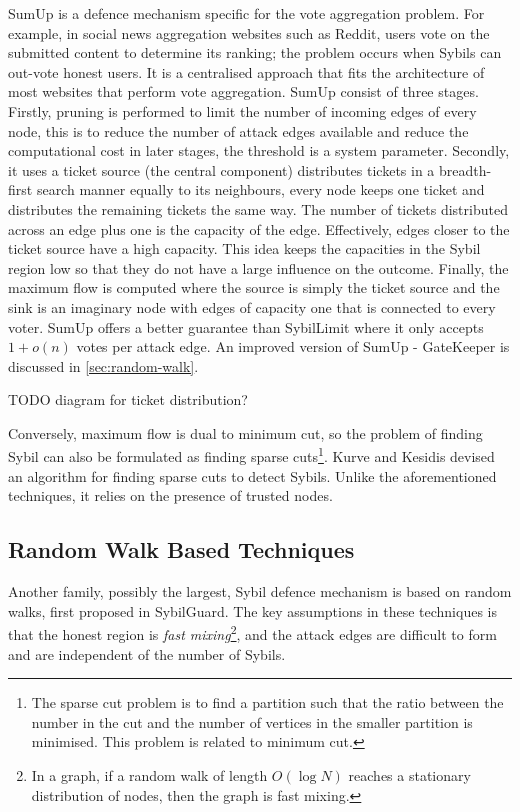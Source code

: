 SumUp\cite{tran2009sybil} is a defence mechanism specific for the vote
aggregation problem. For example, in social news aggregation websites such as
Reddit, users vote on the submitted content to determine its ranking; the
problem occurs when Sybils can out-vote honest users. It is a centralised
approach that fits the architecture of most websites that perform vote
aggregation. SumUp consist of three stages. Firstly, pruning is performed to
limit the number of incoming edges of every node, this is to reduce the number
of attack edges available and reduce the computational cost in later stages, the
threshold is a system parameter. Secondly, it uses a ticket source (the central
component) distributes tickets in a breadth-first search manner equally to its
neighbours, every node keeps one ticket and distributes the remaining tickets
the same way. The number of tickets distributed across an edge plus one is the
capacity of the edge. Effectively, edges closer to the ticket source have a high
capacity. This idea keeps the capacities in the Sybil region low so that they do
not have a large influence on the outcome. Finally, the maximum flow is computed
where the source is simply the ticket source and the sink is an imaginary node
with edges of capacity one that is connected to every voter. SumUp offers a
better guarantee than SybilLimit where it only accepts $1 + o(n)$ votes per
attack edge. An improved version of SumUp - GateKeeper is discussed in
\autoref{sec:random-walk}.

TODO diagram for ticket distribution?

Conversely, maximum flow is dual to minimum cut, so the problem of finding Sybil
can also be formulated as finding sparse cuts\footnote{The sparse cut problem is
  to find a partition such that the ratio between the number in the cut and the
  number of vertices in the smaller partition is minimised. This problem is
  related to minimum cut.}. Kurve and Kesidis devised an algorithm for finding
sparse cuts to detect Sybils\cite{kurve2011sybil}. Unlike the aforementioned
techniques, it relies on the presence of trusted nodes.

\subsection{Random Walk Based Techniques}\label{sec:random-walk}
Another family, possibly the largest, Sybil defence mechanism is based on random
walks, first proposed in SybilGuard\cite{yu2006sybilguard}. The key assumptions
in these techniques is that the honest region is \emph{fast mixing}\footnote{In
  a graph, if a random walk of length $O(\log{N})$ reaches a stationary
  distribution of nodes, then the graph is fast mixing.}, and the attack edges
are difficult to form and are independent of the number of Sybils.

